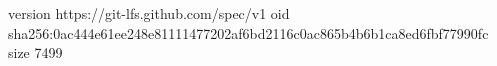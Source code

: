 version https://git-lfs.github.com/spec/v1
oid sha256:0ac444e61ee248e81111477202af6bd2116c0ac865b4b6b1ca8ed6fbf77990fc
size 7499
